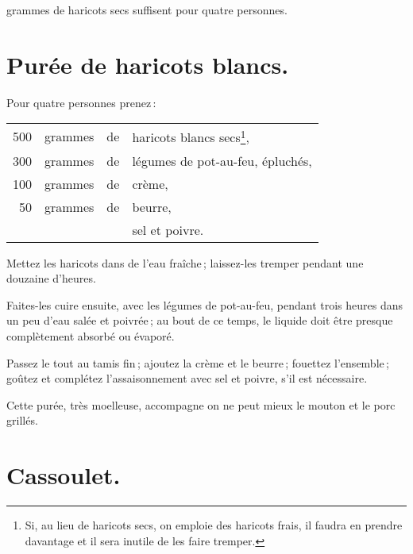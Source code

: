 {\mmm} grammes de haricots secs suffisent pour quatre personnes.

\section*{\centering Purée de haricots blancs.}
{}

Pour quatre personnes prenez :

\footnotesize
\begin{longtable}{rrrp{16em}}
    500 & grammes & de & haricots blancs secs\footnote{Si, au lieu de haricots secs,
                         on emploie des haricots frais, il faudra en prendre davantage
                         et il sera inutile de les faire tremper.},                                       \\
    300 & grammes & de & légumes de pot-au-feu, épluchés,                                                 \\
    100 & grammes & de & crème,                                                                           \\
     50 & grammes & de & beurre,                                                                          \\
        &         &    & sel et poivre.                                                                   \\
\end{longtable}
\normalsize

Mettez les haricots dans de l'eau fraîche ; laissez-les tremper pendant une
douzaine d'heures.

Faites-les cuire ensuite, avec les légumes de pot-au-feu, pendant trois heures
dans un peu d'eau salée et poivrée ; au bout de ce temps, le liquide doit être
presque complètement absorbé ou évaporé.

Passez le tout au tamis fin ; ajoutez la crème et le beurre ; fouettez
l'ensemble ; goûtez et complétez l'assaisonnement avec sel et poivre, s'il est
nécessaire.

Cette purée, très moelleuse, accompagne on ne peut mieux le mouton et le porc
grillés.

\section*{\centering Cassoulet.}
{}


